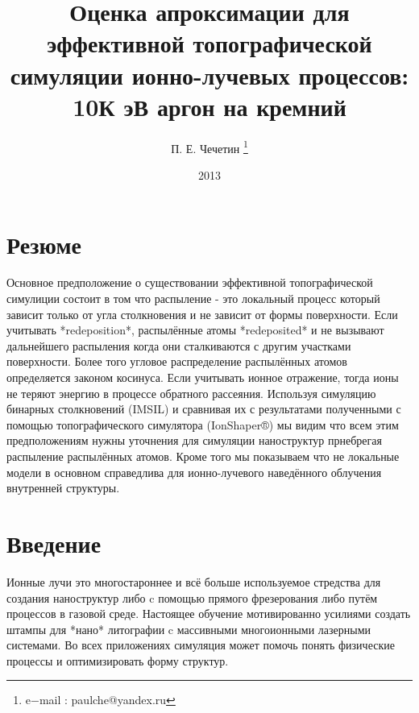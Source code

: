 \documentclass[a4paper,fontsize=12pt]{article}
\begin{document}

%

\begin{titlepage}
  \title{Оценка апроксимации для эффективной топографической симуляции ионно-лучевых процессов: 10К эВ аргон на кремний}
  \author{П. Е. Чечетин \thanks{e−mail : paulche@yandex.ru }} \date{2013}
  \maketitle
\end{titlepage}

\section{Резюме}
Основное предположение о существовании эффективной топографической симулиции состоит в том что распыление - это локальный процесс который зависит только от угла столкновения и не зависит от формы поверхности. Если учитывать *redeposition*, распылённые атомы *redeposited* и не вызывают дальнейшего распыления когда они сталкиваются с другим участками поверхности. Более того угловое распределение распылённых атомов определяется законом косинуса. Если учитывать ионное отражение, тогда ионы не теряют энергию в процессе обратного рассеяния. Используя симуляцию бинарных столкновений (IMSIL) и сравнивая их с результатами полученными с помощью топографического симулятора (IonShaper®) мы видим что всем этим предположениям нужны уточнения для симуляции наноструктур прнебрегая распыление распылённых атомов. Кроме того мы показываем что не локальные модели в основном справедлива для ионно-лучевого наведённого облучения внутренней структуры.

\section{Введение}
Ионные лучи это многостароннее и всё больше используемое стредства для создания наноструктур либо c помощью прямого фрезерования либо путём процессов в газовой среде. Настоящее обучение мотивированно усилиями создать штампы для *нано* литографии c массивными многоионными лазерными системами. Во всех приложениях симуляция может помочь понять физические процессы и оптимизировать форму структур.
\end{document}
